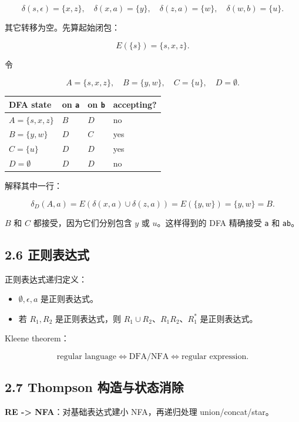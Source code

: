 ﻿\documentclass[UTF8,11pt]{ctexart}
\begin{document}
\[
\delta(s,\epsilon)=\{x,z\},\quad \delta(x,a)=\{y\},\quad
\delta(z,a)=\{w\},\quad \delta(w,b)=\{u\}.
\]

其它转移为空。先算起始闭包：

\[
E(\{s\})=\{s,x,z\}.
\]

令

\[
A=\{s,x,z\},\quad B=\{y,w\},\quad C=\{u\},\quad D=\emptyset.
\]


\begin{longtable}{|p{}|p{}|p{}|p{}|}
\hline
\textbf{DFA state} & \textbf{on \texttt{a}} & \textbf{on \texttt{b}} & \textbf{accepting?} \\
\hline
\(A=\{s,x,z\}\) & \(B\) & \(D\) & no \\
\hline
\(B=\{y,w\}\) & \(D\) & \(C\) & yes \\
\hline
\(C=\{u\}\) & \(D\) & \(D\) & yes \\
\hline
\(D=\emptyset\) & \(D\) & \(D\) & no \\
\hline
\end{longtable}


解释其中一行：

\[
\delta_D(A,a)=E(\delta(x,a)\cup\delta(z,a))=E(\{y,w\})=\{y,w\}=B.
\]

\(B\) 和 \(C\) 都接受，因为它们分别包含 \(y\) 或 \(u\)。这样得到的 DFA 精确接受 \texttt{a} 和 \texttt{ab}。


\subsection{2.6 正则表达式}


正则表达式递归定义：


\begin{itemize}
\item \(\emptyset,\epsilon,a\) 是正则表达式。
\item 若 \(R_1,R_2\) 是正则表达式，则 \(R_1\cup R_2\)、\(R_1R_2\)、\(R_1^*\) 是正则表达式。
\end{itemize}


Kleene theorem：

\[
\text{regular language}\iff \text{DFA/NFA}\iff \text{regular expression}.
\]


\subsection{2.7 Thompson 构造与状态消除}


\textbf{RE -> NFA}：对基础表达式建小 NFA，再递归处理 union/concat/star。
\end{document}
